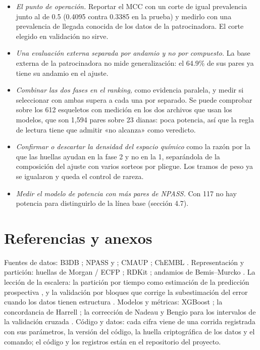 \documentclass[letterpaper,11pt]{article}
\providecommand{\tightlist}{\setlength{\itemsep}{0pt}\setlength{\parskip}{0pt}}
\begin{document}
\begin{itemize}
\tightlist
\item
  \emph{El punto de operación.} Reportar el MCC con un corte de igual prevalencia junto al de 0.5 (0.4095 contra 0.3385 en la prueba) y medirlo con una prevalencia de llegada conocida de los datos de la patrocinadora. El corte elegido en validación no sirve.
\item
  \emph{Una evaluación externa separada por andamio y no por compuesto.} La base externa de la patrocinadora no mide generalización: el 64.9\% de sus pares ya tiene su andamio en el ajuste.
\item
  \emph{Combinar las dos fases en el ranking,} como evidencia paralela, y medir si seleccionar con ambas supera a cada una por separado. Se puede comprobar sobre los 612 esqueletos con medición en los dos archivos que usan los modelos, que son 1,594 pares sobre 23 dianas: poca potencia, así que la regla de lectura tiene que admitir «no alcanza» como veredicto.
\item
  \emph{Confirmar o descartar la densidad del espacio químico} como la razón por la que las huellas ayudan en la fase 2 y no en la 1, separándola de la composición del ajuste con varios sorteos por pliegue. Los tramos de peso ya se igualaron y queda el control de rareza.
\item
  \emph{Medir el modelo de potencia con más pares de NPASS.} Con 117 no hay potencia para distinguirlo de la línea base (sección 4.7).
\end{itemize}

\section*{Referencias y anexos}
Fuentes de datos: B3DB \autocite{meng2021b3db}; NPASS \autocite{zhao2023npass} y \autocite{lin2026npass}; CMAUP \autocite{hou2024cmaup}; ChEMBL \autocite{zdrazil2024chembl}. Representación y partición: huellas de Morgan / ECFP \autocite{rogers2010ecfp}; RDKit \autocite{rdkit}; andamios de Bemis--Murcko \autocite{bemis1996properties}. La lección de la escalera: la partición por tiempo como estimación de la predicción prospectiva \autocite{sheridan2013}, y la validación por bloques que corrige la subestimación del error cuando los datos tienen estructura \autocite{roberts2017crossvalidation}. Modelos y métricas: XGBoost \autocite{chen2016xgboost}; la concordancia de Harrell \autocite{harrell1982yield}; la corrección de Nadeau y Bengio para los intervalos de la validación cruzada \autocite{nadeau2003inference}. Código y datos: cada cifra viene de una corrida registrada con sus parámetros, la versión del código, la huella criptográfica de los datos y el comando; el código y los registros están en el repositorio del proyecto.
\end{document}
